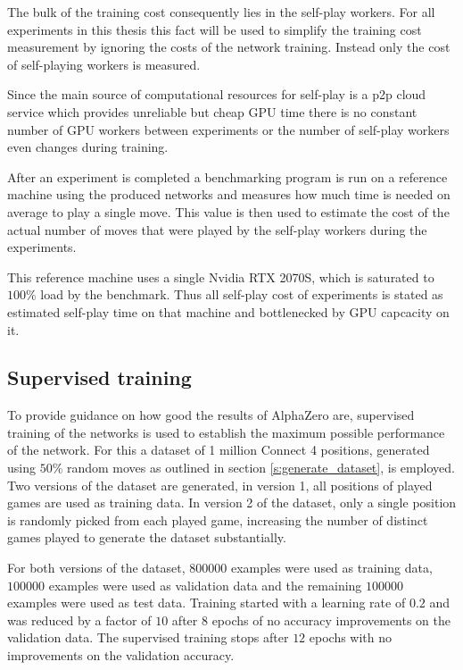 \documentclass[12pt,onecolumn,oneside,titlepage]{article}
\begin{document}
The bulk of the training cost consequently lies in the self-play workers. For all experiments in this thesis this fact will be used to simplify the training cost measurement by ignoring the costs of the network training. Instead only the cost of self-playing workers is measured.

Since the main source of computational resources for self-play is a p2p cloud service which provides unreliable but cheap GPU time there is no constant number of GPU workers between experiments or the number of self-play workers even changes during training.

After an experiment is completed a benchmarking program is run on a reference machine using the produced networks and measures how much time is needed on average 
to play a single move. This value is then used to estimate the cost of the actual number of moves that were played by the self-play workers during the experiments.

This reference machine uses a single Nvidia RTX 2070S, which is saturated to $100\%$ load by the benchmark. Thus all self-play cost of experiments is stated as estimated self-play time on that machine and bottlenecked by GPU capcacity on it.

\subsection{Supervised training}\label{sec:supervised}

To provide guidance on how good the results of AlphaZero are, supervised training of the networks is used to establish the maximum possible performance of the network.
For this a dataset of 1 million Connect 4 positions, generated using $50\%$ random moves as outlined in section \ref{s:generate_dataset}, is employed. Two versions of the dataset are generated, in version 1, all positions of played games are used as training data.
In version 2 of the dataset, only a single position is randomly picked from each played game, increasing the number of distinct games played to generate the dataset substantially.

For both versions of the dataset, $800000$ examples were used as training data, $100000$ examples were used as validation data and the remaining $100000$ examples were used as test data.
Training started with a learning rate of $0.2$ and was reduced by a factor of $10$ after $8$ epochs of no accuracy improvements on the validation data. The supervised training stops after $12$ epochs with no improvements on the validation accuracy.
\end{document}
